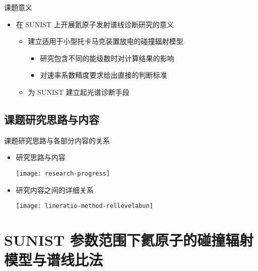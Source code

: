 \begin{CJK*}{UTF8}{kai}
\begin{frame}{课题意义}
	\begin{itemize}
		\item 在 SUNIST 上开展氦原子发射谱线诊断研究的意义
			\begin{itemize}
				\item 建立适用于小型托卡马克装置放电的碰撞辐射模型
					\begin{itemize}
						\item 研究包含不同的能级数时对计算结果的影响
						\item 对速率系数精度要求给出直接的判断标准
					\end{itemize}
				\item 为 SUNIST 建立起光谱诊断手段%
			\end{itemize}
	\end{itemize}
\end{frame}

\subsection{课题研究思路与内容}

\begin{frame}{课题研究思路与各部分内容的关系}
	\begin{itemize}
		\item 研究思路与内容\\
			\begin{center}
			\texttt{[image: research-progress]}
			\end{center}
		\item 研究内容之间的详细关系\\
			\begin{center}
			\texttt{[image: lineratio-method-rellevelabun]}
			\end{center}
	\end{itemize}
\end{frame}

\section{SUNIST 参数范围下氦原子的碰撞辐射模型与谱线比法}


\end{CJK*}
